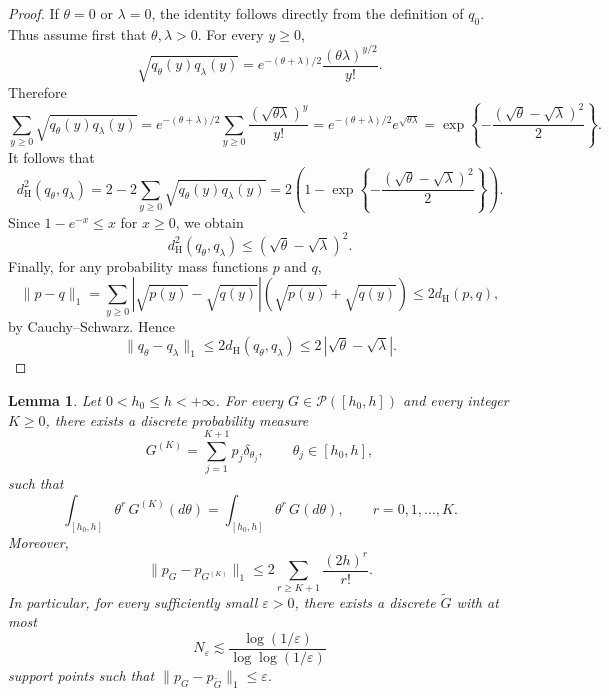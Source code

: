 \documentclass[twoside,12pt]{article}
\newtheorem{lem}[thm]{Lemma}
\begin{document}
\begin{proof}
If $\theta=0$ or $\lambda=0$, the identity follows directly from the definition of $q_0$. Thus assume first that $\theta,\lambda>0$. For every $y\ge 0$,
\begin{displaymath}
\sqrt{q_\theta(y)q_\lambda(y)}=e^{-(\theta+\lambda)/2}\frac{(\theta\lambda)^{y/2}}{y!}.
\end{displaymath}
Therefore
\begin{displaymath}
\sum_{y\ge 0}\sqrt{q_\theta(y)q_\lambda(y)}=e^{-(\theta+\lambda)/2}\sum_{y\ge 0}\frac{(\sqrt{\theta\lambda})^y}{y!}=e^{-(\theta+\lambda)/2}e^{\sqrt{\theta\lambda}}=
\exp\!\left\{-\frac{(\sqrt{\theta}-\sqrt{\lambda})^2}{2}\right\}.
\end{displaymath}
It follows that
\begin{displaymath}
d_{\mathrm H}^2(q_\theta,q_\lambda)=2-2\sum_{y\ge 0}\sqrt{q_\theta(y)q_\lambda(y)}=2\left(1-\exp\!\left\{-\frac{(\sqrt{\theta}-\sqrt{\lambda})^2}{2}\right\}\right).
\end{displaymath}
Since $1-e^{-x}\le x$ for $x\ge 0$, we obtain
\begin{displaymath}
d_{\mathrm H}^2(q_\theta,q_\lambda)\le(\sqrt{\theta}-\sqrt{\lambda})^2.
\end{displaymath}
Finally, for any probability mass functions $p$ and $q$,
\begin{displaymath}
\|p-q\|_1=\sum_{y\ge 0}|\sqrt{p(y)}-\sqrt{q(y)}|(\sqrt{p(y)}+\sqrt{q(y)})\le2d_{\mathrm H}(p,q),
\end{displaymath}
by Cauchy--Schwarz. Hence
\begin{displaymath}
\|q_\theta-q_\lambda\|_1\le2d_{\mathrm H}(q_\theta,q_\lambda)\le2\,|\sqrt{\theta}-\sqrt{\lambda}|.
\end{displaymath}
\end{proof}

\begin{lem}
\label{lem:Poisson_moment_matching}
Let $0<h_0\le h<+\infty$. For every $G\in\mathcal P([h_{0},h])$ and every integer $K\ge 0$, there exists a discrete probability measure
\begin{displaymath}
G^{(K)}=\sum_{j=1}^{K+1}p_j\delta_{\theta_j},\qquad \theta_j\in[h_{0},h],
\end{displaymath}
such that
\begin{displaymath}
\int_{[h_{0},h]} \theta^r\,G^{(K)}(d\theta)=\int_{[h_{0},h]} \theta^r\,G(d\theta),\qquad r=0,1,\dots,K.
\end{displaymath}
Moreover,
\begin{displaymath}
\|p_G-p_{G^{(K)}}\|_1\le 2\sum_{r\geq K+1}\frac{(2h)^r}{r!}.
\end{displaymath}
In particular, for every sufficiently small $\varepsilon>0$, there exists a discrete $\tilde G$ with at most
\begin{displaymath}
N_\varepsilon \lesssim\frac{\log(1/\varepsilon)}{\log\log(1/\varepsilon)}
\end{displaymath}
support points such that $\|p_G-p_{\tilde G}\|_1\le\varepsilon$.
\end{lem}
\end{document}
